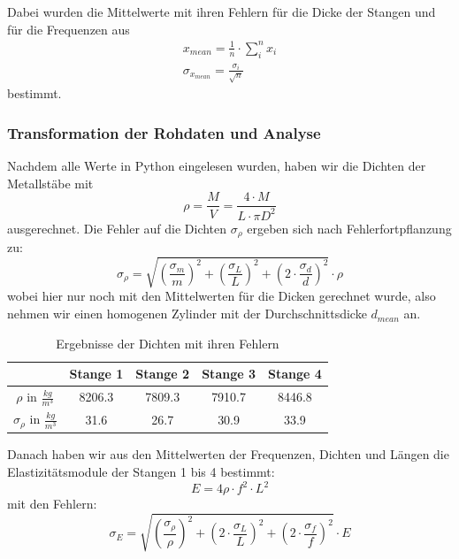 \documentclass[12pt,a4paper]{article}
\begin{document}
Dabei wurden die Mittelwerte mit ihren Fehlern für die Dicke der Stangen und für die Frequenzen aus
\begin{align}
x_{mean}=\frac{1}{n} \cdot \sum_i^n x_i\\
\sigma_{x_{mean}}=\frac{\sigma_i}{\sqrt{n}}
\end{align}
bestimmt.
\subsubsection{Transformation der Rohdaten und Analyse}
Nachdem alle Werte in Python eingelesen wurden, haben wir die Dichten der Metallstäbe mit
\begin{equation}
\rho=\frac{M}{V}=\frac{4\cdot M}{L\cdot \pi D^2}
\end{equation}
ausgerechnet.\newline
Die Fehler auf die Dichten $\sigma_{\rho}$ ergeben sich nach Fehlerfortpflanzung zu:
\begin{equation}
\sigma_{\rho}=\sqrt{(\frac{\sigma_m}{m})^2+(\frac{\sigma_L}{L})^2+(2\cdot \frac{\sigma_d}{d})^2}\cdot \rho
\end{equation}
wobei hier nur noch mit den Mittelwerten für die Dicken gerechnet wurde, also nehmen wir einen homogenen Zylinder mit der Durchschnittsdicke $d_{mean}$ an.

\begin{table}[H]\centering
\caption{Ergebnisse der Dichten mit ihren Fehlern}
\begin{tabular}{c|cccc}
  & Stange 1 & Stange 2 & Stange 3 & Stange 4 \\ 
  \hline
$\rho$ in $\frac{kg}{m^3}$ & 8206.3 & 7809.3 & 7910.7 & 8446.8 \\ 
$\sigma_{\rho}$ in $\frac{kg}{m^3}$ & 31.6 & 26.7 & 30.9 & 33.9 \\ 
\end{tabular} 
\end{table}

Danach haben wir aus den Mittelwerten der Frequenzen, Dichten und Längen die Elastizitätsmodule der Stangen 1 bis 4 bestimmt:
\begin{equation}
E=4\rho\cdot f^2\cdot  L^2
\end{equation}
mit den Fehlern:
\begin{equation}
\sigma_{E}=\sqrt{(\frac{\sigma_{\rho}}{\rho})^2+(2\cdot \frac{\sigma_L}{L})^2+(2\cdot \frac{\sigma_f}{f})^2}\cdot E
\end{equation}
\end{document}
